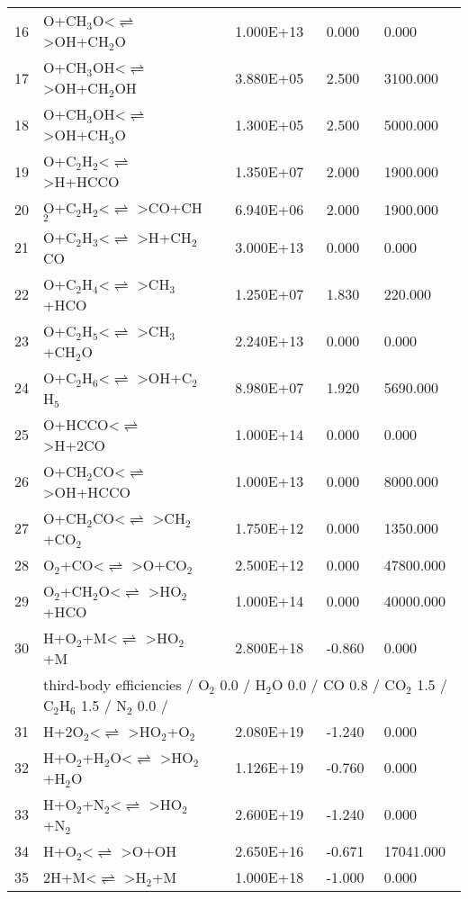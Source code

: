 \documentclass[11pt]{article}
\begin{document}
\begin{table}[hbt]
\begin{tabular}{|r l c l l l|}
16 &	O+CH$_{3}$O<$\rightleftharpoons$ >OH+CH$_{2}$O&	&	1.000E+13&	0.000&	0.000\\ 
17 &	O+CH$_{3}$OH<$\rightleftharpoons$ >OH+CH$_{2}$OH&	&	3.880E+05&	2.500&	3100.000\\ 
18 &	O+CH$_{3}$OH<$\rightleftharpoons$ >OH+CH$_{3}$O&	&	1.300E+05&	2.500&	5000.000\\ 
19 &	O+C$_{2}$H$_{2}$<$\rightleftharpoons$ >H+HCCO&	&	1.350E+07&	2.000&	1900.000\\ 
20 &	O+C$_{2}$H$_{2}$<$\rightleftharpoons$ >CO+CH$_{2}$&	&	6.940E+06&	2.000&	1900.000\\ 
21 &	O+C$_{2}$H$_{3}$<$\rightleftharpoons$ >H+CH$_{2}$CO&	&	3.000E+13&	0.000&	0.000\\ 
22 &	O+C$_{2}$H$_{4}$<$\rightleftharpoons$ >CH$_{3}$+HCO&	&	1.250E+07&	1.830&	220.000\\ 
23 &	O+C$_{2}$H$_{5}$<$\rightleftharpoons$ >CH$_{3}$+CH$_{2}$O&	&	2.240E+13&	0.000&	0.000\\ 
24 &	O+C$_{2}$H$_{6}$<$\rightleftharpoons$ >OH+C$_{2}$H$_{5}$&	&	8.980E+07&	1.920&	5690.000\\ 
25 &	O+HCCO<$\rightleftharpoons$ >H+2CO&	&	1.000E+14&	0.000&	0.000\\ 
26 &	O+CH$_{2}$CO<$\rightleftharpoons$ >OH+HCCO&	&	1.000E+13&	0.000&	8000.000\\ 
27 &	O+CH$_{2}$CO<$\rightleftharpoons$ >CH$_{2}$+CO$_{2}$&	&	1.750E+12&	0.000&	1350.000\\ 
28 &	O$_{2}$+CO<$\rightleftharpoons$ >O+CO$_{2}$&	&	2.500E+12&	0.000&	47800.000\\ 
29 &	O$_{2}$+CH$_{2}$O<$\rightleftharpoons$ >HO$_{2}$+HCO&	&	1.000E+14&	0.000&	40000.000\\ 
30 &	H+O$_{2}$+M<$\rightleftharpoons$ >HO$_{2}$+M&	&	2.800E+18&	-0.860&	0.000\\ 
	&\multicolumn{5}{l|}{third-body efficiencies  / O$_{2}$ 0.0 / H$_{2}$O 0.0 / CO 0.8 / CO$_{2}$ 1.5 / C$_{2}$H$_{6}$ 1.5 / N$_{2}$ 0.0 /}\\ 
31 &	H+2O$_{2}$<$\rightleftharpoons$ >HO$_{2}$+O$_{2}$&	&	2.080E+19&	-1.240&	0.000\\ 
32 &	H+O$_{2}$+H$_{2}$O<$\rightleftharpoons$ >HO$_{2}$+H$_{2}$O&	&	1.126E+19&	-0.760&	0.000\\ 
33 &	H+O$_{2}$+N$_{2}$<$\rightleftharpoons$ >HO$_{2}$+N$_{2}$&	&	2.600E+19&	-1.240&	0.000\\ 
34 &	H+O$_{2}$<$\rightleftharpoons$ >O+OH&	&	2.650E+16&	-0.671&	17041.000\\ 
35 &	2H+M<$\rightleftharpoons$ >H$_{2}$+M&	&	1.000E+18&	-1.000&	0.000\\ 

\end{tabular}
\end{table}
\end{document}
